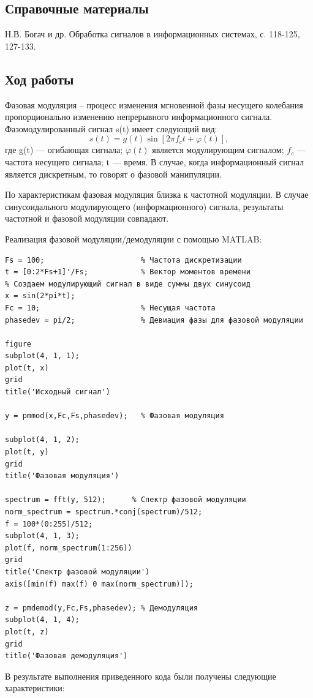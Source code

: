 \documentclass[10pt,a4paper]{article}
\begin{document}
\subsection{Справочные материалы}
Н.В. Богач и др. Обработка сигналов в информационных системах, с. 118-125, 127-133.

\subsection{Ход работы}
Фазовая модуляция – процесс изменения мгновенной фазы несущего колебания пропорционально изменению непрерывного информационного сигнала. Фазомодулированный сигнал s(t) имеет следующий вид:
	\begin{equation}
	s(t) = g(t) \sin[2 \pi f_c t + \varphi(t)],
	\end{equation}
где g(t) — огибающая сигнала; $\varphi(t)$ является модулирующим сигналом; $f_c$ — частота несущего сигнала; t — время.
В случае, когда информационный сигнал является дискретным, то говорят о фазовой манипуляции.

По характеристикам фазовая модуляция близка к частотной модуляции. В случае синусоидального модулирующего (информационного) сигнала, результаты частотной и фазовой модуляции совпадают.

Реализация фазовой модуляции/демодуляции с помощью MATLAB:
\begin{verbatim}
Fs = 100;                      % Частота дискретизации 
t = [0:2*Fs+1]'/Fs;            % Вектор моментов времени
% Создаем модулирующий сигнал в виде суммы двух синусоид
x = sin(2*pi*t);
Fc = 10;                       % Несущая частота 
phasedev = pi/2;               % Девиация фазы для фазовой модуляции

figure
subplot(4, 1, 1);
plot(t, x)
grid
title('Исходный сигнал')

y = pmmod(x,Fc,Fs,phasedev);   % Фазовая модуляция

subplot(4, 1, 2);
plot(t, y)
grid
title('Фазовая модуляция')

spectrum = fft(y, 512);      % Спектр фазовой модуляции
norm_spectrum = spectrum.*conj(spectrum)/512;
f = 100*(0:255)/512;
subplot(4, 1, 3);
plot(f, norm_spectrum(1:256))
grid
title('Спектр фазовой модуляции')
axis([min(f) max(f) 0 max(norm_spectrum)]);

z = pmdemod(y,Fc,Fs,phasedev); % Демодуляция
subplot(4, 1, 4);
plot(t, z)
grid
title('Фазовая демодуляция')
\end{verbatim}


В результате выполнения приведенного кода были получены следующие характеристики:
\end{document}
